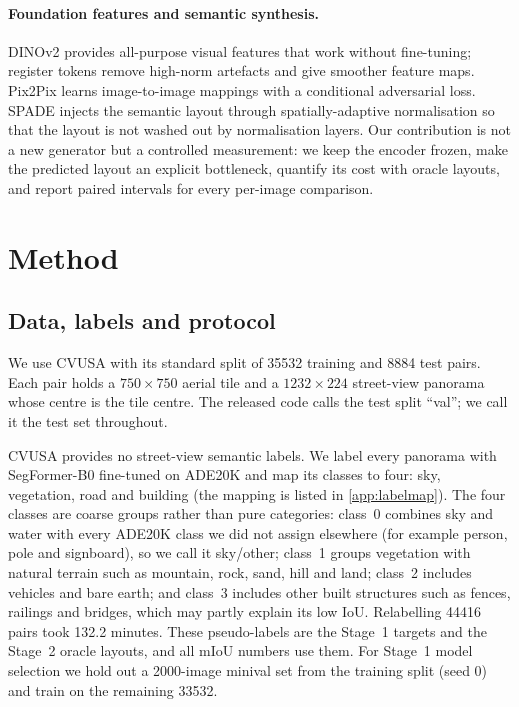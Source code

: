 \documentclass[11pt]{article}
\begin{document}
\paragraph{Foundation features and semantic synthesis.} DINOv2 \cite{oquab2023dinov2} provides
all-purpose visual features that work without fine-tuning; register tokens \cite{darcet2023registers} remove
high-norm artefacts and give smoother feature maps. Pix2Pix \cite{isola2017pix2pix} learns image-to-image
mappings with a conditional adversarial loss. SPADE \cite{park2019spade} injects the semantic layout through
spatially-adaptive normalisation so that the layout is not washed out by normalisation layers. Our
contribution is not a new generator but a controlled measurement: we keep the encoder frozen, make the
predicted layout an explicit bottleneck, quantify its cost with oracle layouts, and report paired intervals
for every per-image comparison.

\section{Method}
\label{sec:method}

\subsection{Data, labels and protocol}
\label{sec:data}
We use CVUSA \cite{workman2015cvusa} with its standard split of \num{35532} training and \num{8884} test pairs.
Each pair holds a $750\times750$ aerial tile and a $1232\times224$ street-view panorama whose centre is the
tile centre. The released code calls the test split ``val''; we call it the test set throughout.

CVUSA provides no street-view semantic labels. We label every panorama with SegFormer-B0
\cite{xie2021segformer} fine-tuned on ADE20K and map its classes to four: sky, vegetation, road and building (the mapping is listed in
\cref{app:labelmap}). The four classes are coarse groups rather than pure categories: class~0 combines sky and
water with every ADE20K class we did not assign elsewhere (for example person, pole and signboard), so we call
it sky/other; class~1 groups vegetation with natural terrain such as mountain, rock, sand, hill and land;
class~2 includes vehicles and bare earth; and class~3 includes other built structures such as fences, railings
and bridges, which may partly explain its low IoU.
Relabelling \num{44416} pairs took 132.2 minutes. These pseudo-labels are the Stage~1 targets and the
Stage~2 oracle layouts, and all mIoU numbers use them. For Stage~1 model selection we hold
out a \num{2000}-image minival set from the training split (seed 0) and train on the remaining \num{33532}.
\end{document}
